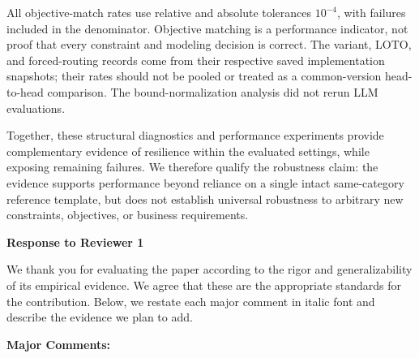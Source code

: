 \documentclass[11pt]{article}
\begin{document}
\begin{enumerate}[label=(AssoE.\arabic*),leftmargin=*]
All objective-match rates use relative and absolute tolerances
$10^{-4}$, with failures included in the denominator.
Objective matching is a performance indicator, not proof that every
constraint and modeling decision is correct.
The variant, LOTO, and forced-routing records come from their
respective saved implementation snapshots; their rates should not
be pooled or treated as a common-version head-to-head comparison.
The bound-normalization analysis did not rerun LLM evaluations.

Together, these structural diagnostics and performance experiments
provide complementary evidence of resilience within the evaluated
settings, while exposing remaining failures.
We therefore qualify the robustness claim: the evidence supports
performance beyond reliance on a single intact same-category
reference template, but does not establish universal robustness
to arbitrary new constraints, objectives, or business requirements.
\endgroup

\end{enumerate}

\newpage
\begin{center}
{\LARGE\textbf{Response to Reviewer 1}}
\end{center}

We thank you for evaluating the paper according to the rigor and generalizability of its empirical evidence. We agree that these are the appropriate standards for the contribution. Below, we restate each major comment in italic font and describe the evidence we plan to add.

\noindent\textbf{Major Comments:}
\end{document}
